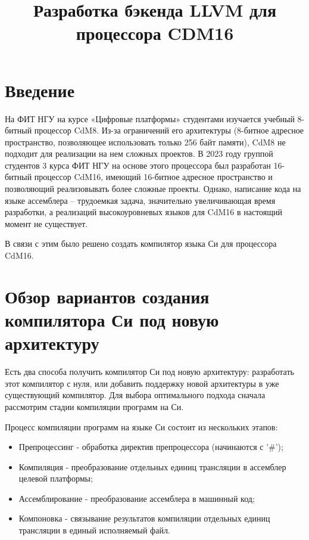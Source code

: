 \documentclass[a4paper,14pt]{extarticle}
\title{Разработка бэкенда LLVM для процессора CDM16}
\author{}
\date{}
\begin{document}


	
\setcounter{page}{3}

\tableofcontents

\pagebreak
\section{Введение}

На ФИТ НГУ на курсе «Цифровые платформы» студентами изучается учебный 8-битный процессор CdM8. Из-за ограничений его архитектуры (8-битное адресное пространство, позволяющее использовать только 256 байт памяти), CdM8 не подходит для реализации на нем сложных проектов. В 2023 году группой студентов 3 курса ФИТ НГУ на основе этого процессора был разработан 16-битный процессор CdM16, имеющий 16-битное адресное пространство и позволяющий реализовывать более сложные проекты. Однако, написание кода на языке ассемблера – трудоемкая задача, значительно увеличивающая время разработки, а реализаций высокоуровневых языков для CdM16 в настоящий момент не существует.

В связи с этим было решено создать компилятор языка Си для процессора CdM16.

\pagebreak
\section{Обзор вариантов создания компилятора Си под новую архитектуру}

Есть два способа получить компилятор Си под новую архитектуру: разработать этот компилятор с нуля, или добавить поддержку новой архитектуры в уже существующий компилятор. Для выбора оптимального подхода сначала рассмотрим стадии компиляции программ на Си.

Процесс компиляции программ на языке Си состоит из нескольких этапов\cite{cpp_compilation}:
\begin{itemize}
	\item Препроцессинг - обработка директив препроцессора (начинаются с '\#');
	\item Компиляция - преобразование отдельных единиц трансляции в ассемблер целевой платформы;
	\item Ассемблирование - преобразование ассемблера в машинный код;
	\item Компоновка - связывание результатов компиляции отдельных единиц трансляции в единый исполняемый файл.
\end{itemize}
\end{document}
